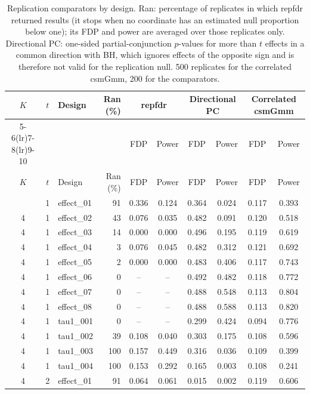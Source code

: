 {\footnotesize\setlength{\tabcolsep}{4pt}
\begin{longtable}{cc l r cc cc cc}
\caption{Replication comparators by design. Ran: percentage of replicates in which repfdr returned results (it stops when no coordinate has an estimated null proportion below one); its FDP and power are averaged over those replicates only. Directional PC: one-sided partial-conjunction $p$-values for more than $t$ effects in a common direction with BH, which ignores effects of the opposite sign and is therefore not valid for the replication null. 500 replicates for the correlated csmGmm, 200 for the comparators.}\label{tab:rep-comparators}\\
\toprule
$K$ & $t$ & Design & Ran (\%) & \multicolumn{2}{c}{repfdr} & \multicolumn{2}{c}{Directional PC} & \multicolumn{2}{c}{Correlated csmGmm}\\
\cmidrule(lr){5-6}\cmidrule(lr){7-8}\cmidrule(lr){9-10}
 & & & & FDP & Power & FDP & Power & FDP & Power\\
\midrule
\endfirsthead
\toprule
$K$ & $t$ & Design & Ran (\%) & FDP & Power & FDP & Power & FDP & Power\\
\midrule
\endhead
\bottomrule
\endfoot
4 & 1 & effect\_01 & 91 & 0.336 & 0.124 & 0.364 & 0.024 & 0.117 & 0.393\\
4 & 1 & effect\_02 & 43 & 0.076 & 0.035 & 0.482 & 0.091 & 0.120 & 0.518\\
4 & 1 & effect\_03 & 14 & 0.000 & 0.000 & 0.496 & 0.195 & 0.119 & 0.619\\
4 & 1 & effect\_04 & 3 & 0.076 & 0.045 & 0.482 & 0.312 & 0.121 & 0.692\\
4 & 1 & effect\_05 & 2 & 0.000 & 0.000 & 0.483 & 0.406 & 0.117 & 0.743\\
4 & 1 & effect\_06 & 0 & -- & -- & 0.492 & 0.482 & 0.118 & 0.772\\
4 & 1 & effect\_07 & 0 & -- & -- & 0.488 & 0.548 & 0.113 & 0.804\\
4 & 1 & effect\_08 & 0 & -- & -- & 0.488 & 0.588 & 0.113 & 0.820\\
4 & 1 & tau1\_001 & 0 & -- & -- & 0.299 & 0.424 & 0.094 & 0.776\\
4 & 1 & tau1\_002 & 39 & 0.108 & 0.040 & 0.303 & 0.175 & 0.108 & 0.596\\
4 & 1 & tau1\_003 & 100 & 0.157 & 0.449 & 0.316 & 0.036 & 0.109 & 0.399\\
4 & 1 & tau1\_004 & 100 & 0.153 & 0.292 & 0.165 & 0.003 & 0.108 & 0.241\\
\midrule
4 & 2 & effect\_01 & 91 & 0.064 & 0.061 & 0.015 & 0.002 & 0.119 & 0.606\\

\end{longtable}}
